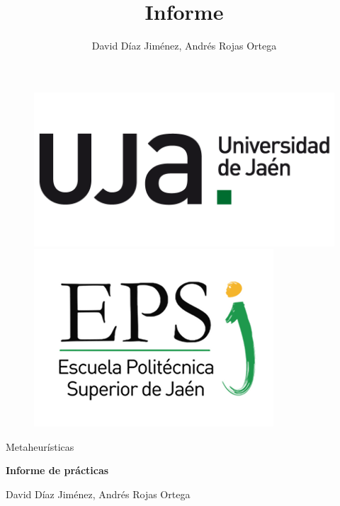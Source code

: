 \documentclass{article}
\title{Informe}
\author{David Díaz Jiménez, Andrés Rojas Ortega}
\begin{document}
	
	\begin{figure}[t]
		\centering
		\includegraphics[scale=0.2]{img/np_UJA_generica_6.png}
		\includegraphics[scale=0.35]{img/Logo_EPS.png}
		
	\end{figure}
	
	\begin{center}
		
		\begin{large}
			
			Metaheurísticas
			
		\end{large}
		
		\vspace*{0.2in}
		\textbf{\large Informe de prácticas}
		
		\vspace*{.2in}
		
		David Díaz Jiménez, Andrés Rojas Ortega
		
		\vspace*{2.5cm}
		
	\end{center}
	
	\tableofcontents
	
	\newpage
	
\end{document}
